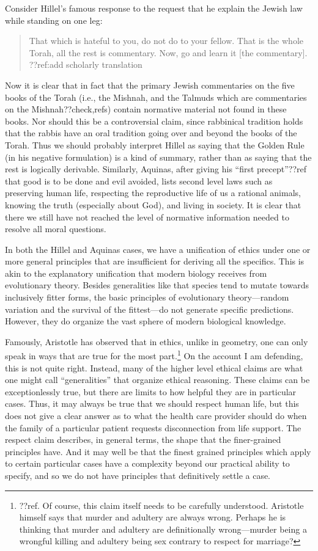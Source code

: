 Consider Hillel's famous response to the request that he explain the Jewish law while standing on one leg: 
\begin{quote}
That which is hateful to you, do not do to your fellow. That is the whole Torah, all the rest is commentary. Now, go and learn it [the commentary].
??ref:add scholarly translation
\end{quote}
Now it is clear that in fact that the primary Jewish commentaries on the five books of the Torah (i.e., the Mishnah, and the
Talmuds which are commentaries on the Mishnah??check,refs) contain normative material not found in these books. Nor should this be 
a controversial claim, since rabbinical tradition holds that the rabbis have an oral tradition going over and beyond the books of 
the Torah. Thus we should probably interpret Hillel as saying that the Golden Rule (in his negative formulation) is a kind of summary,
rather than as saying that the rest is logically derivable. Similarly, Aquinas, after giving his ``first precept''??ref that good is to be done and evil avoided, lists second level laws such as
preserving human life, respecting the reproductive life of us a rational animals, knowing the truth (especially about God), and living 
in society. It is clear that there we still have not reached the level of normative information needed to resolve all moral 
questions.

In both the Hillel and Aquinas cases, we have a unification of ethics under one or more general principles that are insufficient
for deriving all the specifics. This is akin to the explanatory unification that modern biology receives from evolutionary theory. 
Besides generalities like that species tend to mutate towards inclusively fitter forms, the basic principles of evolutionary theory---random 
variation and the survival of the fittest---do not generate specific predictions. However, they do organize the vast sphere of modern
biological knowledge. 

Famously, Aristotle has observed that in ethics, unlike in geometry, one can only speak in ways that are true for the most 
part.\footnote{??ref. Of course, this claim itself needs to be carefully understood. Aristotle himself says that murder and 
adultery are always wrong. Perhaps he is thinking that murder and adultery are definitionally wrong---murder being a wrongful 
killing and adultery being sex contrary to respect for marriage?} On the account I am defending, this is not quite right. Instead,
many of the higher level ethical claims are what one might call ``generalities'' that organize ethical reasoning. These claims 
can be exceptionlessly true, but there are limits to how helpful they are in particular cases. Thus, it may always be true that we 
should respect human life, but this does not give a clear answer as to what the health care provider should do when the family of 
a particular patient requests disconnection from life support. The respect claim describes, in general terms, the shape that the 
finer-grained principles have. And it may well be that the finest grained principles which apply to certain particular cases
have a complexity beyond our practical ability to specify, and so we do not have principles that definitively settle a case.

